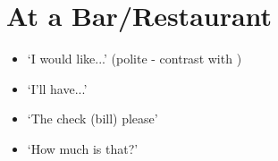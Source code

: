 \section{At a Bar/Restaurant}
\begin{itemize}[nosep]
    \item {} `I would like...' (polite - contrast with )
    \item {} `I'll have...'
    \item {} `The check (bill) please'
    \item {} `How much is that?'
\end{itemize}

